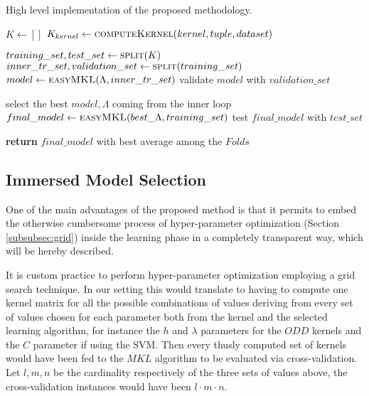 \begin{algorithm}
    \caption{High level implementation of the proposed methodology.}
    \label{alg:method}
    \begin{algorithmic}[1]
        \State $K \gets []$
        \label{line:kernels}
                \State $K_{kernel} \gets \Call{computeKernel}{kernel, tuple, dataset}$
            \EndFor
        \EndFor

            \State $training\_set, test\_set \gets \Call{split}{K}$
                    \State $inner\_tr\_set, validation\_set \gets \Call{split}{training\_set}$
                    \State $model \gets \Call{easyMKL}{\Lambda,inner\_tr\_set}$
                    \State validate $model$ with $validation\_set$
                \EndFor
            \EndFor
            
            \State select the best $model,\Lambda$ coming from the inner loop
            \State $final\_model \gets \Call{easyMKL}{best\_\Lambda,training\_set}$
            \State test $final\_model$ with $test\_set$
        \EndFor

        \State \textbf{return} $final\_model$ with best average among the $Folds$
    \end{algorithmic}
\end{algorithm}

\subsection{Immersed Model Selection}
\label{subsec:parameters}
One of the main advantages of the proposed method is that it permits to embed
the otherwise cumbersome process of hyper-parameter optimization (Section \ref{subsubsec:grid})
inside the learning phase in a completely transparent way, which will be hereby
described.

It is custom practice to perform hyper-parameter optimization employing a grid
search technique.
In our setting this would translate to having to compute one kernel matrix
for all the possible combinations of values deriving from every set of values
chosen for each parameter both from the kernel and the selected learning
algorithm, for instance the $h$ and $\lambda$ parameters for the $ODD$ kernels
and the $C$ parameter if using the SVM.
Then every thusly computed set of kernels would have been fed to the $MKL$
algorithm to be evaluated via cross-validation.
Let $l,m,n$ be the cardinality respectively of the three sets of values above,
the cross-validation instances would have been $l\cdot m\cdot n$.

